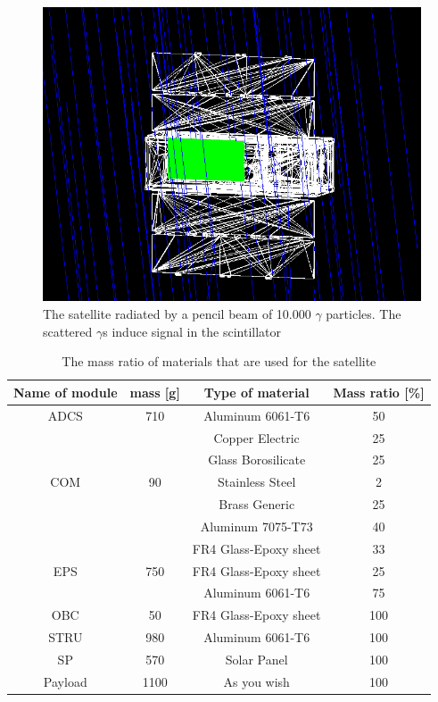 \documentclass[12pt, a4paper,titlepage]{article}
\numberwithin{equation}{section}
\numberwithin{figure}{section}
\begin{document}
\begin{figure}[h!]
\includegraphics[width=150.0mm]{images/satellite_rad.png}
\caption{The satellite radiated by a pencil beam of 10.000 $\gamma$ particles. The scattered $\gamma$s induce signal in the scintillator}
\end{figure}

\begin{table}[h!]
\begin{center}
\begin{tabular}{ |c|c|c|c|} 
 \hline
 Name of module & mass [g] & Type of material & Mass ratio [\%]\\\hline
 ADCS &	710	& Aluminum 6061-T6 &	50\\
			& & Copper Electric	& 25 \\
			& &  Glass Borosilicate 	& 25\\\hline
COM	& 	90	& 	Stainless Steel 	& 2\\
			& 	& Brass Generic		& 25\\
			& 	& Aluminum 7075-T73		& 40\\
			& 	& FR4 Glass-Epoxy sheet	& 	33\\\hline
EPS	& 	750	& 	FR4 Glass-Epoxy sheet		& 25\\
			& 	& Aluminum 6061-T6		& 75\\\hline
OBC	&	50		& FR4 Glass-Epoxy sheet	& 	100\\\hline
STRU	& 	980		& Aluminum 6061-T6	& 	100\\\hline
SP	& 	570		& Solar Panel	& 	100\\\hline
Payload	& 	1100	& 	As you wish	& 	100\\
 \hline
\end{tabular}
\end{center}
\caption{The mass ratio of materials that are used for the satellite}
\end{table}
\end{document}
